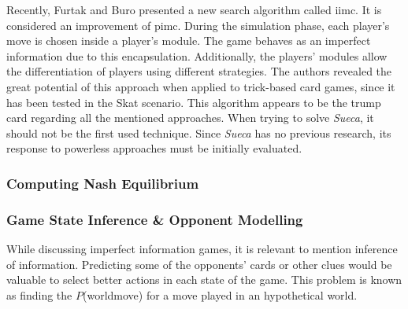 Recently, Furtak and Buro \cite{Furtak} presented a new search algorithm called \gls{iimc}.
It is considered an improvement of \gls{pimc}.
During the simulation phase, each player's move is chosen inside a player's module.
The game behaves as an imperfect information due to this encapsulation.
Additionally, the players' modules allow the differentiation of players using different strategies.
The authors revealed the great potential of this approach when applied to trick-based card games, since it has been tested in the Skat scenario.
This algorithm appears to be the trump card regarding all the mentioned approaches.
When trying to solve \emph{Sueca}, it should not be the first used technique.
Since \emph{Sueca} has no previous research, its response to powerless approaches must be initially evaluated.



\subsubsection{Computing Nash Equilibrium}






\subsubsection{Game State Inference \& Opponent Modelling}


While discussing imperfect information games, it is relevant to mention inference of information.
Predicting some of the opponents' cards or other clues would be valuable to select better actions in each state of the game.
This problem is known as finding the $P$(world\textbar move) for a move played in an hypothetical world.


